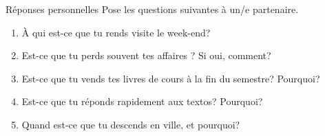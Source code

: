 \begin{frame}{Réponses personnelles}
  Pose les questions suivantes à un/e partenaire. \\
  \begin{center}
    \begin{enumerate}
      \item À qui est-ce que tu rends visite le week-end?
      \item Est-ce que tu perds souvent tes affaires ? Si oui, comment?
      \item Est-ce que tu vends tes livres de cours à la fin du semestre? Pourquoi?
      \item Est-ce que tu réponds rapidement aux textos? Pourquoi?
      \item Quand est-ce que tu descends en ville, et pourquoi?
    \end{enumerate}
  \end{center}
\end{frame}